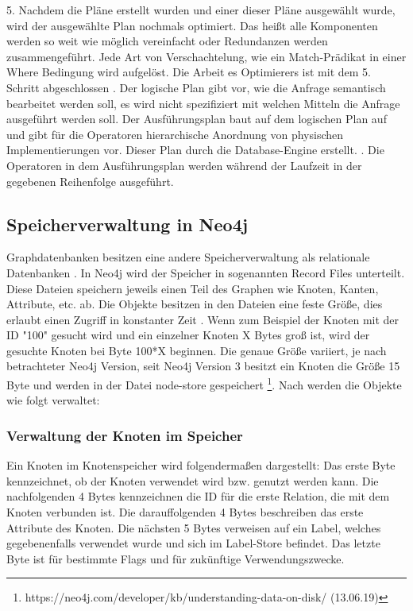 5. Nachdem die Pläne erstellt wurden und einer dieser Pläne ausgewählt wurde, wird der ausgewählte Plan nochmals optimiert. Das heißt alle Komponenten werden so weit wie möglich vereinfacht oder Redundanzen werden zusammengeführt. Jede Art von Verschachtelung, wie ein Match-Prädikat in einer Where Bedingung wird aufgelöst. Die Arbeit es Optimierers ist mit dem 5. Schritt abgeschlossen \newline {}. Der logische Plan gibt vor, wie die Anfrage semantisch bearbeitet werden soll, es wird nicht spezifiziert mit welchen Mitteln die Anfrage ausgeführt werden soll. Der Ausführungsplan baut auf dem logischen Plan auf und gibt für die Operatoren hierarchische Anordnung von physischen  Implementierungen vor. Dieser Plan durch die Database-Engine erstellt.  \newline {}. Die Operatoren in dem Ausführungsplan werden während der Laufzeit in der gegebenen Reihenfolge ausgeführt. 


\subsection{Speicherverwaltung in Neo4j}
Graphdatenbanken besitzen eine andere Speicherverwaltung als relationale Datenbanken \parencite{angles2012comparison}. In Neo4j wird der Speicher in sogenannten Record Files unterteilt. Diese Dateien speichern jeweils einen Teil des Graphen wie Knoten, Kanten, Attribute, etc. ab. Die Objekte besitzen in den Dateien eine feste Größe, dies erlaubt einen Zugriff in konstanter Zeit \parencite{robinson2013graph}. Wenn zum Beispiel der Knoten mit der ID "100" gesucht wird und ein einzelner Knoten X Bytes groß ist, wird der gesuchte Knoten bei Byte 100*X beginnen. Die genaue Größe  variiert, je nach betrachteter Neo4j Version, seit Neo4j Version 3 besitzt ein Knoten die Größe 15 Byte und werden in der Datei node-store gespeichert \footnote{https://neo4j.com/developer/kb/understanding-data-on-disk/ (13.06.19)}. Nach \parencite{robinson2013graph} werden die Objekte wie folgt verwaltet:
\subsubsection{Verwaltung der Knoten im Speicher}
Ein Knoten im Knotenspeicher wird folgendermaßen dargestellt: Das erste Byte kennzeichnet, ob der Knoten verwendet wird bzw. genutzt werden kann. Die nachfolgenden 4 Bytes kennzeichnen die ID für die erste Relation, die mit dem Knoten verbunden ist. Die darauffolgenden 4 Bytes beschreiben das erste Attribute des Knoten. Die nächsten 5 Bytes verweisen auf ein Label, welches gegebenenfalls verwendet wurde und sich im Label-Store befindet. Das letzte Byte ist für bestimmte Flags und für zukünftige Verwendungszwecke. 
